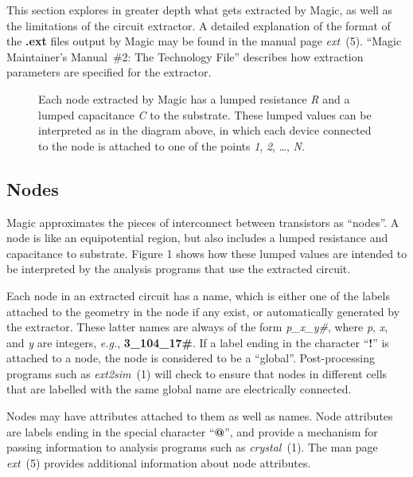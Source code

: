 \documentclass[letterpaper,twoside,12pt]{article}
\begin{document}
This section explores in greater depth what gets extracted by Magic,
as well as the limitations of the circuit extractor.
A detailed explanation of the format of the {\bfseries .ext} files
output by Magic may be found in the manual page {\itshape ext}~(5).
``Magic Maintainer's Manual\ \#2: The Technology File''
describes how extraction parameters are specified for the extractor.

\begin{figure}[ht]
   \begin{center}
      \caption{Each node extracted by Magic has a lumped resistance
	{\itshape R} and a lumped capacitance {\itshape C} to the
	substrate.  These lumped values can be interpreted as in the
	diagram above, in which each device connected to the node is
	attached to one of the points {\itshape 1}, {\itshape 2},
	\dots, {\itshape N}.}
   \end{center}
\end{figure}

\subsection{Nodes}

Magic approximates the pieces of interconnect between transistors
as ``nodes''.  A node is like an equipotential region, but
also includes a lumped resistance and capacitance to substrate.
Figure 1 shows how these lumped values are intended to be interpreted by
the analysis programs that use the extracted circuit.

Each node in an extracted circuit has a name, which is either
one of the labels attached to the geometry in the node if any exist,
or automatically generated by the extractor.  These latter names
are always of the form {\itshape p{\_}x{\_}y\#}, where
{\itshape p}, {\itshape x}, and {\itshape y} are integers,
{\itshape e.g.}, {\bfseries 3{\_}104{\_}17\#}.
If a label ending in the character ``{\bfseries !}'' is attached to a
node, the node is considered to be a ``global''.  Post-processing
programs such as {\itshape ext2sim}~(1) will check to ensure that
nodes in different cells that are labelled with the same global
name are electrically connected.

Nodes may have attributes attached to them as well as names.
Node attributes are labels ending in the special character
``{\bfseries @}'', and provide a mechanism for passing information
to analysis programs such as {\itshape crystal}~(1).  The man
page {\itshape ext}~(5) provides additional information about
node attributes.
\end{document}
